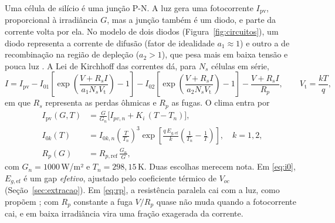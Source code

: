 \documentclass[3p,authoryear]{elsarticle}
\newcommand{\Ipv}{I_{\mathrm{pv}}}
\newcommand{\Vt}{V_{\mathrm{t}}}
\begin{document}
Uma célula de silício é uma junção P-N. A luz gera uma fotocorrente $\Ipv$, proporcional à
irradiância $G$, mas a junção também é um diodo, e parte da corrente volta por ela. No
modelo de dois diodos (Figura~\ref{fig:circuitos}), um diodo representa a corrente de
difusão (fator de idealidade $a_1 \approx 1$) e outro a de recombinação na região de
depleção ($a_2 > 1$), que pesa mais em baixa tensão e pouca luz \citep{ishaque}. A Lei de
Kirchhoff das correntes dá, para $N_s$ células em série,
\begin{equation}
I = \Ipv
 - I_{01}\!\left[\exp\!\left(\frac{V+R_sI}{a_1 N_s\Vt}\right)-1\right]
 - I_{02}\!\left[\exp\!\left(\frac{V+R_sI}{a_2 N_s\Vt}\right)-1\right]
 - \frac{V+R_sI}{R_p},
\qquad \Vt = \frac{kT}{q},
\label{eq:2d}
\end{equation}
em que $R_s$ representa as perdas ôhmicas e $R_p$ as fugas. O clima entra por
\begin{align}
\Ipv(G,T) &= \frac{G}{G_n}\Big[I_{pv,n} + K_i\,(T-T_n)\Big], \label{eq:ipv}\\
I_{0k}(T) &= I_{0k,n}\left(\frac{T}{T_n}\right)^{3}
  \exp\!\left[\frac{q\,E_{g,\mathrm{ef}}}{k}\left(\frac{1}{T_n}-\frac{1}{T}\right)\right],
  \quad k=1,2, \label{eq:i0}\\
R_p(G) &= R_{p,\mathrm{ref}}\,\frac{G_n}{G}, \label{eq:rp}
\end{align}
com $G_n = 1000$\,W/m² e $T_n = 298{,}15$\,K. Duas escolhas merecem nota. Em
\eqref{eq:i0}, $E_{g,\mathrm{ef}}$ é um gap \emph{efetivo}, ajustado pelo coeficiente
térmico de $V_{oc}$ (Seção~\ref{sec:extracao}). Em \eqref{eq:rp}, a resistência paralela cai
com a luz, como propõem \citet{desoto}; com $R_p$ constante a fuga $V/R_p$ quase não muda
quando a fotocorrente cai, e em baixa irradiância vira uma fração exagerada da corrente.
\end{document}
